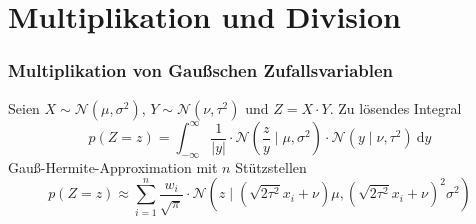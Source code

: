 \documentclass[11pt]{beamer}
\begin{document}
\section{Multiplikation und Division}

\begin{frame}
  \frametitle{Multiplikation von Gaußschen Zufallsvariablen}

  Seien $X \sim \mathcal{N}(\mu, \sigma^{2})$,
  $Y \sim \mathcal{N}(\nu, \tau^{2})$ und $Z = X \cdot Y$. \vfill
  Zu lösendes Integral
  \begin{equation*}
    p(Z = z) = \int_{-\infty}^{\infty} \frac{1}{|y|} \cdot \mathcal{N}\left( \frac{z}{y} \mid \mu, \sigma^{2} \right) \cdot \mathcal{N}(y \mid \nu, \tau^{2})~\mathrm{d}y
  \end{equation*}
  \vfill
  Gauß-Hermite-Approximation mit $n$ Stützstellen
  \begin{equation*}
    p(Z = z) \approx \sum_{i = 1}^{n} \frac{w_{i}}{\sqrt{\pi}} \cdot \mathcal{N}\left( z \mid \left(\sqrt{2 \tau^{2}} x_{i} + \nu\right)\mu, \left(\sqrt{2 \tau^{2}} x_{i} + \nu\right)^{2}\sigma^{2} \right)
  \end{equation*}
\end{frame}
\end{document}
